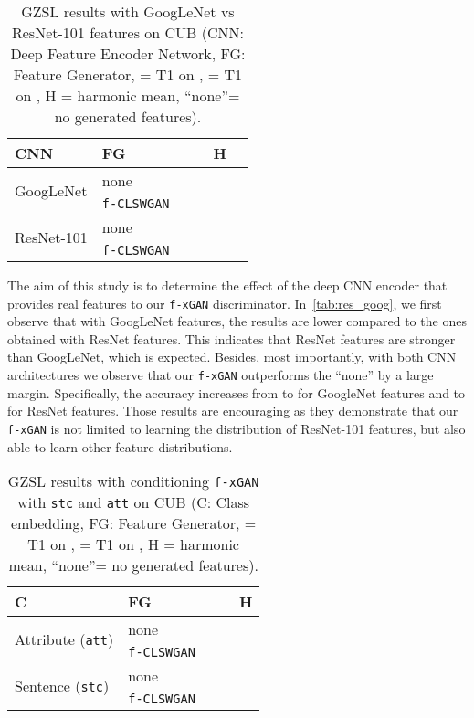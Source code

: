 \documentclass[10pt,twocolumn,letterpaper]{article}
\newcommand{\myparagraph}[1]{\vspace{6pt}\noindent{\bf #1}}
\def\mthd{\texttt{f-xGAN}\xspace}
\begin{document}
{
\setlength{\tabcolsep}{5pt}
\renewcommand{\arraystretch}{1.2}
\begin{table}[t]
 \centering
   \begin{tabular}{l l c c c c }
CNN & FG &  &  & \textbf{H} \\ \hline
   \multirow{2}{*}{GoogLeNet} & none  &  &  &  \\ & \texttt{f-CLSWGAN}  &   &  &    \\ \hline  
  \multirow{2}{*}{ResNet-101} & none  &  &  &  \\ & \texttt{f-CLSWGAN}  &   &  &    \\ \end{tabular} 
\caption{GZSL results with GoogLeNet vs ResNet-101 features on CUB (CNN: Deep Feature Encoder Network, FG: Feature Generator,  = T1 on ,  = T1 on , H = harmonic mean, ``none''= no generated features).
}
\label{tab:res_goog}
\end{table}
}

\myparagraph{Effect of CNN Architectures.} The aim of this study is to determine the effect of the deep CNN encoder that provides real features to our \mthd discriminator. In~\autoref{tab:res_goog}, we first observe that with GoogLeNet features, the results are lower compared to the ones obtained with ResNet features.
This indicates that ResNet features are stronger than GoogLeNet, which is expected. Besides, most importantly, with both CNN architectures we observe that our \mthd outperforms the ``none'' by a large margin. Specifically, the accuracy increases from  to  for GoogleNet features and  to  for ResNet features. Those results are encouraging as they demonstrate that our \mthd is not limited to learning the distribution of ResNet-101 features, but also able to learn other feature distributions.

{
\setlength{\tabcolsep}{5pt}
\renewcommand{\arraystretch}{1.2}
\begin{table}[t]
 \centering
   \begin{tabular}{l l c c c }
C & FG &  &  & \textbf{H} \\ \hline  
     \multirow{2}{*}{Attribute (\texttt{att})}& none  &   &  &   \\ & \texttt{f-CLSWGAN} &  &  &  \\ \hline
     \multirow{2}{*}{Sentence (\texttt{stc})} & none   &  &  &     \\ & \texttt{f-CLSWGAN} &  &  &    \\ \end{tabular} 
\caption{GZSL results with conditioning \texttt{\mthd} with \texttt{stc} and \texttt{att} on CUB (C: Class embedding, FG: Feature Generator,   = T1 on ,  = T1 on , H = harmonic mean, ``none''= no generated features).}
\label{tab:language}
\end{table}
}
\end{document}
